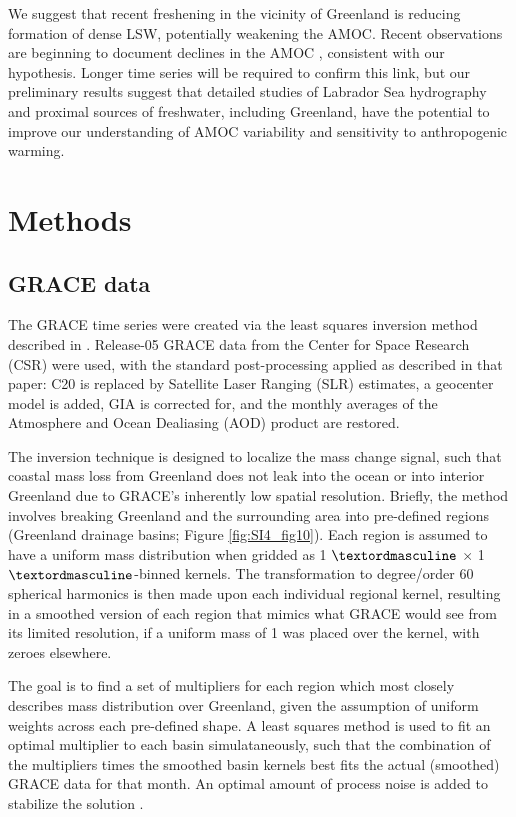 We suggest that recent freshening in the vicinity of Greenland is reducing formation of dense LSW, potentially weakening the AMOC.   Recent observations are beginning to document declines in the AMOC \cite[]{robson2013,smeed2014,rahmstorf2015}, consistent with our hypothesis.  Longer time series will be required to confirm this link, but our preliminary results suggest that detailed studies of Labrador Sea hydrography and proximal sources of freshwater, including Greenland, have the potential to improve our understanding of AMOC variability and sensitivity to anthropogenic warming.
 
\section{Methods}
\subsection{GRACE data}
The GRACE time series were created via the least squares inversion method described in \citet{bonin2013}.  Release-05 GRACE data from the Center for Space Research (CSR) were used, with the standard post-processing applied as described in that paper: C20 is replaced by Satellite Laser Ranging (SLR) estimates, a geocenter model is added, GIA is corrected for, and the monthly averages of the Atmosphere and Ocean Dealiasing (AOD) product are restored.

The inversion technique is designed to localize the mass change signal, such that coastal mass loss from Greenland does not leak into the ocean or into interior Greenland due to GRACE’s inherently low spatial resolution.  Briefly, the method involves breaking Greenland and the surrounding area into pre-defined regions (Greenland drainage basins; Figure \ref{fig:SI4_fig10}).  Each region is assumed to have a uniform mass distribution when gridded as 1 $\textordmasculine$ $\times$ 1 $\textordmasculine$-binned kernels.  The transformation to degree/order 60 spherical harmonics is then made upon each individual regional kernel, resulting in a smoothed version of each region that mimics what GRACE would see from its limited resolution, if a uniform mass of 1 was placed over the kernel, with zeroes elsewhere.

The goal is to find a set of multipliers for each region which most closely describes mass distribution over Greenland, given the assumption of uniform weights across each pre-defined shape.  A least squares method is used to fit an optimal multiplier to each basin simulataneously, such that the combination of the multipliers times the smoothed basin kernels best fits the actual (smoothed) GRACE data for that month.  An optimal amount of process noise is added to stabilize the solution \cite[]{bonin2013}. 

